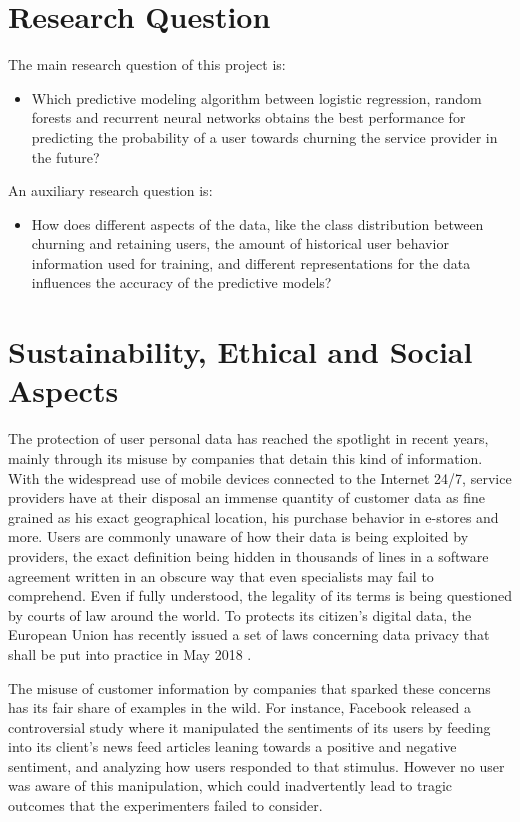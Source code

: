\documentclass{kththesis}
\begin{document}
      
\section{Research Question}	
	
The main research question of this project is:

\begin{itemize}
\item Which predictive modeling algorithm between logistic regression, random forests and recurrent neural networks obtains the best performance for predicting the probability of a user towards churning the service provider in the future?
\end{itemize}	

An auxiliary research question is:

\begin{itemize}
\item How does different aspects of the data, like the class distribution between churning and retaining users, the amount of historical user behavior information used for training, and different representations for the data influences the accuracy of the predictive models?
\end{itemize}


\section{Sustainability, Ethical and Social Aspects}

The protection of user personal data has reached the spotlight in recent years, mainly through its misuse by companies that detain this kind of information. With the widespread use of mobile devices connected to the Internet 24/7, service providers have at their disposal an immense quantity of customer data as fine grained as his exact geographical location, his purchase behavior in e-stores and more. Users are commonly unaware of how their data is being exploited by providers, the exact definition being hidden in thousands of lines in a software agreement written in an obscure way that even specialists may fail to comprehend. Even if fully understood, the legality of its terms is being questioned by courts of law around the world. To protects its citizen's digital data, the European Union has recently issued a set of laws concerning data privacy that shall be put into practice in May 2018 \citep{eu2017protection}.

The misuse of customer information by companies that sparked these concerns has its fair share of examples in the wild. For instance, Facebook released a controversial study where it manipulated the sentiments of its users by feeding into its client's news feed articles leaning towards a positive and negative sentiment, and analyzing how users responded to that stimulus\citep{kramer2014experimental}. However no user was aware of this manipulation, which could inadvertently lead to tragic outcomes that the experimenters failed to consider. 
\end{document}
